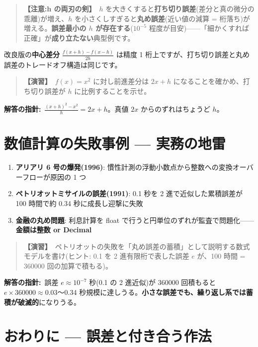 \documentclass{article}
\begin{document}
\begin{quote}
\textbf{【注意:h の両刃の剣】}\ \(h\) を大きくすると\textbf{打ち切り誤差}(差分と真の微分の乖離)が増え、\(h\) を小さくしすぎると\textbf{丸め誤差}(近い値の減算 = 桁落ち)が増える。\textbf{誤差最小の \(h\) が存在する}(\(10^{-5}\) 程度が目安)——「細かくすれば正確」が\textbf{成り立たない}典型例です。
\end{quote}

改良版の\textbf{中心差分} \(\frac{f(x+h) - f(x-h)}{2h}\) は精度 1 桁上ですが、打ち切り誤差と丸め誤差のトレードオフ構造は同じです。

\begin{quote}
\textbf{【演習】}\ \(f(x) = x^2\) に対し前進差分は \(2x + h\) になることを確かめ、打ち切り誤差が \(h\) に比例することを示せ。
\end{quote}

\textbf{解答の指針:}\ \(\frac{(x+h)^2 - x^2}{h} = 2x + h\)。真値 \(2x\) からのずれはちょうど \(h\)。

\section{数値計算の失敗事例 — 実務の地雷}

\begin{enumerate}
\item \textbf{アリアリ 6 号の爆発(1996)}: 慣性計測の浮動小数点から整数への変換オーバーフローが原因の 1 つ
\item \textbf{ペトリオットミサイルの誤差(1991)}: 0.1 秒を 2 進で近似した累積誤差が 100 時間で約 0.34 秒に成長し迎撃に失敗
\item \textbf{金融の丸め問題}: 利息計算を float で行うと円単位のずれが監査で問題化——\textbf{金額は整数 or Decimal}
\end{enumerate}

\begin{quote}
\textbf{【演習】}\ ペトリオットの失敗を「丸め誤差の蓄積」として説明する数式モデルを書け(ヒント: 0.1 を 2 進有限桁で表した誤差 \(e\) が、100 時間 = 360000 回の加算で積もる)。
\end{quote}

\textbf{解答の指針:}\ 誤差 \(e \approx 10^{-7}\) 秒(0.1 の 2 進近似)が 360000 回積もると \(e \times 360000 \approx 0.03\)〜0.34 秒規模に達しうる。\textbf{小さな誤差でも、繰り返し系では蓄積が破滅的}になりうる。

\section{おわりに — 誤差と付き合う作法}
\end{document}
